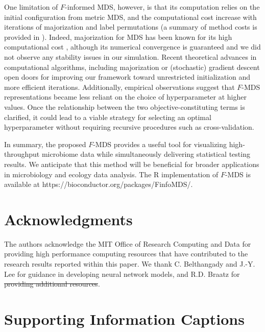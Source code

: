 \documentclass[10pt,letterpaper]{article}
\newcommand{\1}{{\rm 1}\kern-0.24em{\rm I}}
\providecommand{\DIFaddtex}[1]{{\protect\color{blue}\uwave{#1}}} %
\providecommand{\DIFdeltex}[1]{{\protect\color{red}\sout{#1}}}                      %
\providecommand{\DIFaddbegin}{} %
\providecommand{\DIFaddend}{} %
\providecommand{\DIFdelbegin}{} %
\providecommand{\DIFdelend}{} %
\providecommand{\DIFadd}[1]{\texorpdfstring{\DIFaddtex{#1}}{#1}} %
\providecommand{\DIFdel}[1]{\texorpdfstring{\DIFdeltex{#1}}{}} %
\newcommand{\DIFscaledelfig}{0.5}
\newlength{\DIFdelgraphicswidth} %
\newlength{\DIFdelgraphicsheight} %
\newcommand{\DIFaddincludegraphics}[2][]{{\color{blue}\fbox{\DIFOincludegraphics[#1]{#2}}}} %
\newcommand{\DIFdelincludegraphics}[2][]{%
\sbox{\DIFdelgraphicsbox}{\DIFOincludegraphics[#1]{#2}}%
\settoboxwidth{\DIFdelgraphicswidth}{\DIFdelgraphicsbox} %
\settoboxtotalheight{\DIFdelgraphicsheight}{\DIFdelgraphicsbox} %
\scalebox{\DIFscaledelfig}{%
\parbox[b]{\DIFdelgraphicswidth}{\usebox{\DIFdelgraphicsbox}\\[-\baselineskip] \rule{\DIFdelgraphicswidth}{0em}}\llap{\resizebox{\DIFdelgraphicswidth}{\DIFdelgraphicsheight}{%
\setlength{\unitlength}{\DIFdelgraphicswidth}%
\begin{picture}(1,1)%
\thicklines\linethickness{2pt} %
{\color[rgb]{1,0,0}\put(0,0){\framebox(1,1){}}}%
{\color[rgb]{1,0,0}\put(0,0){\line( 1,1){1}}}%
{\color[rgb]{1,0,0}\put(0,1){\line(1,-1){1}}}%
\end{picture}%
}\hspace*{3pt}}} %
} %
\DeclareRobustCommand{\DIFaddbegin}{\DIFOaddbegin \let\includegraphics\DIFaddincludegraphics} %
\DeclareRobustCommand{\DIFaddend}{\DIFOaddend \let\includegraphics\DIFOincludegraphics} %
\DeclareRobustCommand{\DIFdelbegin}{\DIFOdelbegin \let\includegraphics\DIFdelincludegraphics} %
\DeclareRobustCommand{\DIFdelend}{\DIFOaddend \let\includegraphics\DIFOincludegraphics} %
\begin{document}
\DIFaddend One limitation of $F$-informed MDS, however, is that its computation relies on the initial configuration from metric MDS, and the computational cost increase with iterations of majorization and label permutations (a summary of method costs is provided in ). Indeed, majorization for MDS has been known for its high computational cost \cite{Fang25}, although its numerical convergence is guaranteed \cite{deleeuw24} and we did not observe any stability issues in our simulation. Recent theoretical advances in computational algorithms, including majorization \cite{Streeter23} or (stochastic) gradient descent \cite{Demaine21, zheng19} open doors for improving our framework toward unrestricted initialization and more efficient iterations. Additionally, empirical observations suggest that $F$-MDS representations became less reliant on the choice of hyperparameter at higher values. Once the relationship between the two objective-constituting terms is clarified, it could lead to a viable strategy for selecting an optimal hyperparameter without requiring recursive procedures such as cross-validation.

In summary, the proposed $F$-MDS provides a useful tool for visualizing high-throughput microbiome data while simultaneously delivering statistical testing results. We anticipate that this method will be beneficial for broader applications in microbiology and ecology data analysis. The R implementation of $F$-MDS is available at https://bioconductor.org/packages/FinfoMDS/.



\section*{Acknowledgments}
The authors acknowledge the MIT Office of Research Computing and Data for providing high performance computing resources that have contributed to the research results reported within this paper. We thank C. Belthangady and J.-Y. Lee for guidance in developing neural network models, and \DIFaddbegin \DIFadd{T. Sapsis and }\DIFaddend R.D. Braatz for \DIFdelbegin \DIFdel{providing additional resources}\DIFdelend \DIFaddbegin \DIFadd{their advice}\DIFaddend .


\nolinenumbers

% 



\section*{Supporting Information Captions}
\end{document}
